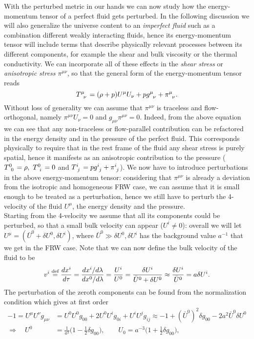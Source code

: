 With the perturbed metric in our hands we can now study how the energy-momentum tensor of a perfect fluid gets perturbed. In the following discussion we will also generalize the universe content to an \emph{imperfect fluid} such as a combination different weakly interacting fluids, hence its energy-momentum tensor will include terms that describe physically relevant processes between its different components, for example the shear and bulk viscosity or the thermal conductivity. We can incorporate all of these effects in the \emph{shear stress} or \emph{anisotropic stress} $\pi^{\mu\nu}$, so that the general form of the energy-momentum tensor reads
\begin{equation}
    \tensor{T}{^\mu_\nu}=(\rho+p)U^\mu U_\nu+p\tensor{g}{^\mu_\nu}+\tensor{\pi}{^\mu_\nu}.
    \label{eq:Generalized_stress-energy_Tensor}
\end{equation}
Without loss of generality we can assume that $\pi^{\mu\nu}$ is traceless and flow-orthogonal, namely $\pi^{\mu\nu}U_\nu=0$ and $g_{\mu\nu}\pi^{\mu\nu}=0$. Indeed, from the above equation we can see that any non-traceless or flow-parallel contribution can be refactored in the energy density and in the pressure of the perfect fluid. This corresponds physically to require that in the rest frame of the fluid any shear stress is purely spatial, hence it manifests as an anisotropic contribution to the pressure ($\tensor{T}{^0_0}=\rho,\ \tensor{T}{^0_i}=0$ and $\tensor{T}{^i_j}=p\tensor{g}{^i_j}+\tensor{\pi}{^i_j}$). We now have to introduce perturbations in the above energy-momentum tensor: considering that $\pi^{\mu\nu}$ is already a deviation from the isotropic and homogeneous FRW case, we can assume that it is small enough to be treated as a perturbation, hence we still have to perturb the 4-velocity of the fluid $U^\mu$, the energy density and the pressure. \\ Starting from the 4-velocity we assume that all its components could be perturbed, so that a small bulk velocity can appear ($U^i\neq0$): overall we will let $U^\mu=(\bar U^0+\delta U^0,\delta U^i)$, where $\bar U^0\gg\delta U^0,\delta U^i$ has the background value $a^{-1}$ that we get in the FRW case. Note that we can now define the bulk velocity of the fluid to be 
$$
v^i\stackrel{\text{def}}{=}\frac{d x^i}{d\tau}=\frac{dx^i/d\lambda}{dx^0/d\lambda}=\frac{U^i}{U^0}=\frac{\delta U^i}{\bar U^0+\delta U^0}\approx \frac{\delta U^i}{\bar U^0}=a\delta U^i.
$$
The perturbation of the zeroth components can be found from the normalization condition which gives at first order
\begin{align*}
    -1=U^\mu U^{\nu}g_{\mu\nu}&=U^0U^0g_{00}+2U^0U^i g_{0i}+U^i U^j g_{ij}\approx -1+(\bar U^0)^2\delta g_{00}-2a^2\bar U^0\delta U^0\\
    \Rightarrow\quad U^0&=\frac{1}{a^3}\bigg(1-\frac{1}{2}\delta g_{00}\bigg),\qquad U_0=a^{-3}\bigg(1+\frac{1}{2}\delta g_{00}\bigg),
\end{align*}
